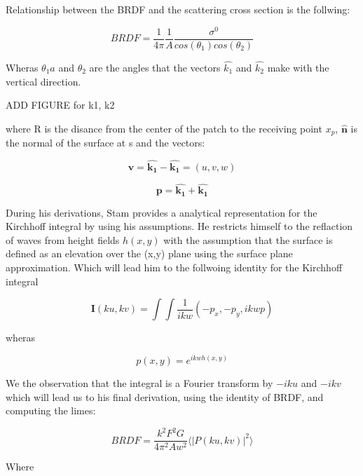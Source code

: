 Relationship between the BRDF and the scattering cross section is the follwing:

\begin{equation}
    BRDF = \frac{1}{4\pi}\frac{1}{A}\frac{\sigma^0}{cos(\theta_1)cos(\theta_2)}
\end{equation}

Wheras $\theta_1a$ and $\theta_2$ are the angles that the vectors $\hat{k_1}$
and $\hat{k_2}$ make with the vertical direction.
 
ADD FIGURE for k1, k2

where R is the disance from the center of the patch to the receiving point $x_p$, $\hat{\mathbf{n}}$ is the normal of the surface at s and the vectors:

\begin{equation*}
    \mathbf{v} = \hat{\mathbf{k_1}} - \hat{\mathbf{k_1}}
               = (u,v,w)
\end{equation*}

\begin{equation*}
    \mathbf{p} = \hat{\mathbf{k_1}} + \hat{\mathbf{k_1}}
\end{equation*}

During his derivations, Stam provides a analytical representation for the Kirchhoff integral by using his assumptions. He restricts himself to the reflaction of waves from height fields $h(x,y)$ with the assumption that the surface is defined as an elevation over the (x,y) plane using the surface plane approximation.
Which will lead him to the follwoing identity for the Kirchhoff integral

\begin{equation}
    \mathbf{I}(ku, kv) = \int \int \frac{1}{ikw}(-p_x, -p_y, ikwp) 
\end{equation}

wheras 

\begin{equation}
    p(x,y) = e^{ikwh(x,y)}
\end{equation}

We the observation that the integral is a Fourier transform by $-iku$ and $-ikv$
which will lead us to his final derivation, using the identity of BRDF, and computing the limes:

\begin{equation}
    BRDF = \frac{k^2 F^2 G}{4\pi^2 A w^2} \langle \left|P(ku, kv)\right|^2\rangle
\end{equation}

Where 

